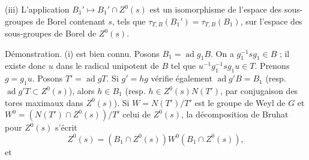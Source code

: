 \documentclass[9pt,twoside]{extarticle}
\begin{document}
{(iii) L'application \(B_1'\mapsto B_1'\cap Z^0(s)\) est un isomorphisme de l'espace des sous-groupes de Borel contenant \(s\), tels que \(\tau_{T,B}(B_1')=\tau_{T,B}(B_1)\), sur l'espace des sous-groupes de Borel de \(Z^0(s)\).\par

Démonstration. (i) est bien connu. Posons \(B_1=\operatorname{ad}g_1B\). On a \(g_1^{-1}sg_1\in B\) ; il existe donc \(u\) dans le radical unipotent de \(B\) tel que \(u^{-1}g_1^{-1}sg_1u\in T\). Prenons \(g=g_1u\). Posons \(T'=\operatorname{ad}gT\). Si \(g'=hg\) vérifie également \(\operatorname{ad}g'B=B_1\) (resp. \(\operatorname{ad}g'T\subset Z^0(s)\)), alors \(h\in B_1\) (resp. \(h\in Z^0(s)N(T')\), par conjugaison des tores maximaux dans \(Z^0(s)\)). Si \(W=N(T')/T'\) est le groupe de Weyl de \(G\) et \(W^0=(N(T')\cap Z^0(s))/T'\) celui de \(Z^0(s)\), la décomposition de Bruhat pour \(Z^0(s)\) s'écrit \[
Z^0(s)=(B_1\cap Z^0(s))W^0(B_1\cap Z^0(s)),
\] et\par
}
\end{document}
